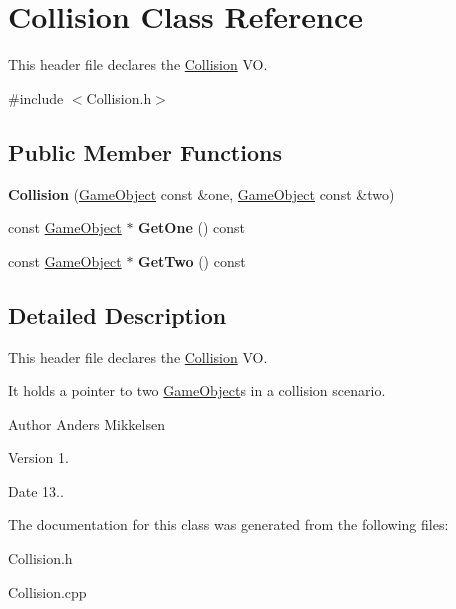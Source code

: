 \hypertarget{class_collision}{}\section{Collision Class Reference}
\label{class_collision}


This header file declares the \hyperlink{class_collision}{Collision} V\+O.  




{\ttfamily \#include $<$Collision.\+h$>$}

\subsection*{Public Member Functions}
\begin{DoxyCompactItemize}
\item 
\hypertarget{class_collision_a90b043fa38e90c4170c097191e91b9b2}{}{\bfseries Collision} (\hyperlink{class_game_object}{Game\+Object} const \&one, \hyperlink{class_game_object}{Game\+Object} const \&two)\label{class_collision_a90b043fa38e90c4170c097191e91b9b2}

\item 
\hypertarget{class_collision_adeb802af5ebc0abb67088ded28caf9ff}{}const \hyperlink{class_game_object}{Game\+Object} $\ast$ {\bfseries Get\+One} () const \label{class_collision_adeb802af5ebc0abb67088ded28caf9ff}

\item 
\hypertarget{class_collision_a6d3b7a8a023e7d26db89897f387dac7b}{}const \hyperlink{class_game_object}{Game\+Object} $\ast$ {\bfseries Get\+Two} () const \label{class_collision_a6d3b7a8a023e7d26db89897f387dac7b}

\end{DoxyCompactItemize}


\subsection{Detailed Description}
This header file declares the \hyperlink{class_collision}{Collision} V\+O. 

It holds a pointer to two \hyperlink{class_game_object}{Game\+Object}\textquotesingle{}s in a collision scenario.

\begin{DoxyAuthor}{Author}
Anders Mikkelsen 
\end{DoxyAuthor}
\begin{DoxyVersion}{Version}
1. 
\end{DoxyVersion}
\begin{DoxyDate}{Date}
13.. 
\end{DoxyDate}


The documentation for this class was generated from the following files\+:\begin{DoxyCompactItemize}
\item 
Collision.\+h\item 
Collision.\+cpp\end{DoxyCompactItemize}
